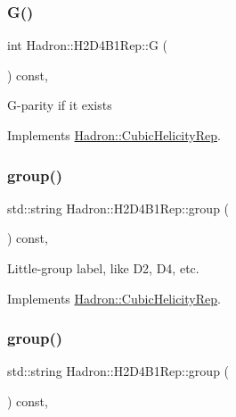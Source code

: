 \subsubsection{\texorpdfstring{G()}{G()}\hspace{0.1cm}{\footnotesize\ttfamily [3/3]}}
{\footnotesize\ttfamily int Hadron\+::\+H2\+D4\+B1\+Rep\+::G (\begin{DoxyParamCaption}{ }\end{DoxyParamCaption}) const\hspace{0.3cm}{\ttfamily [inline]}, {\ttfamily [virtual]}}

G-\/parity if it exists 

Implements \mbox{\hyperlink{structHadron_1_1CubicHelicityRep_a50689f42be1e6170aa8cf6ad0597018b}{Hadron\+::\+Cubic\+Helicity\+Rep}}.

\mbox{\label{structHadron_1_1H2D4B1Rep_aabf48ead894c892df15d0203bd7dc107}} 
\subsubsection{\texorpdfstring{group()}{group()}\hspace{0.1cm}{\footnotesize\ttfamily [1/5]}}
{\footnotesize\ttfamily std\+::string Hadron\+::\+H2\+D4\+B1\+Rep\+::group (\begin{DoxyParamCaption}{ }\end{DoxyParamCaption}) const\hspace{0.3cm}{\ttfamily [inline]}, {\ttfamily [virtual]}}

Little-\/group label, like D2, D4, etc. 

Implements \mbox{\hyperlink{structHadron_1_1CubicHelicityRep_a101a7d76cd8ccdad0f272db44b766113}{Hadron\+::\+Cubic\+Helicity\+Rep}}.

\mbox{\label{structHadron_1_1H2D4B1Rep_aabf48ead894c892df15d0203bd7dc107}} 
\subsubsection{\texorpdfstring{group()}{group()}\hspace{0.1cm}{\footnotesize\ttfamily [2/5]}}
{\footnotesize\ttfamily std\+::string Hadron\+::\+H2\+D4\+B1\+Rep\+::group (\begin{DoxyParamCaption}{ }\end{DoxyParamCaption}) const\hspace{0.3cm}{\ttfamily [inline]}, {\ttfamily [virtual]}}

